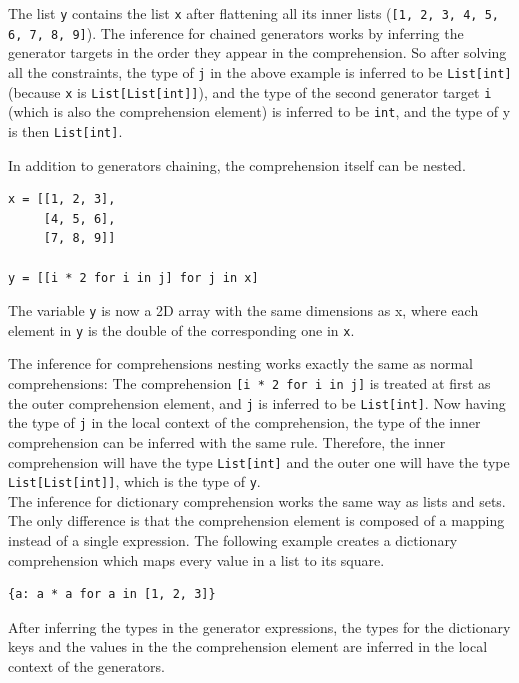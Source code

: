 The list \lstinline|y| contains the list \lstinline|x| after flattening all its inner lists (\lstinline|[1, 2, 3, 4, 5, 6, 7, 8, 9]|). The inference for chained generators works by inferring the generator targets in the order they appear in the comprehension. So after solving all the constraints, the type of \lstinline|j| in the above example is inferred to be \lstinline|List[int]| (because \lstinline|x| is \lstinline|List[List[int]]|), and the type of the second generator target \lstinline|i| (which is also the comprehension element) is inferred to be \lstinline|int|, and the type of y is then \lstinline|List[int]|.

In addition to generators chaining, the comprehension itself can be nested.
\begin{lstlisting}
x = [[1, 2, 3],
     [4, 5, 6],
     [7, 8, 9]]
	 
y = [[i * 2 for i in j] for j in x]	 
\end{lstlisting}

The variable \lstinline|y| is now a 2D array with the same dimensions as x, where each element in \lstinline|y| is the double of the corresponding one in \lstinline|x|.

The inference for comprehensions nesting works exactly the same as normal comprehensions: The comprehension \lstinline|[i * 2 for i in j]| is treated at first as the outer comprehension element, and \lstinline|j| is inferred to be \lstinline|List[int]|. Now having the type of \lstinline|j| in the local context of the comprehension, the type of the inner comprehension can be inferred with the same rule. Therefore, the inner comprehension will have the type \lstinline|List[int]| and the outer one will have the type \lstinline|List[List[int]]|, which is the type of \lstinline|y|.\\

The inference for dictionary comprehension works the same way as lists and sets. The only difference is that the comprehension element is composed of a mapping instead of a single expression. The following example creates a dictionary comprehension which maps every value in a list to its square.
\begin{lstlisting}
{a: a * a for a in [1, 2, 3]}
\end{lstlisting}

After inferring the types in the generator expressions, the types for the dictionary keys and the values in the the comprehension element are inferred in the local context of the generators.

